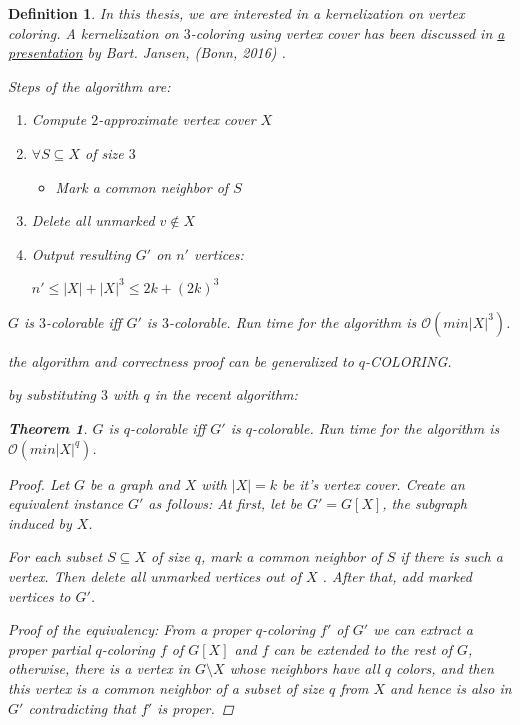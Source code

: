 \documentclass[12pt]{article}
\theoremstyle{slplain}
\newtheorem{theorem}{Theorem}[section]
\newtheorem{defi}{Definition}[section]
\begin{document}
\begin{defi}
In this thesis, we are interested in a kernelization on vertex coloring. 
A kernelization on $3$-coloring using vertex cover has been discussed in \href{https://onedrive.live.com/view.aspx?resid=D39E73028C0B20E6!2586&ithint=file%2cpptx&app=PowerPoint&authkey=!AFs8zyWC8bfQ0PA}{a presentation} by Bart. Jansen, (Bonn, 2016) \cite{bart}.

Steps of the algorithm are:

\begin{enumerate}
\item Compute $2$-approximate vertex cover $X$

\item $\forall S\subseteq X$ of size $3$
\begin{itemize}
\item Mark a common neighbor of $S$
\end{itemize}
\item Delete all unmarked $v \not\in X$

\item Output resulting $G'$ on $n'$ vertices:

\begin{center}
$n' \leq |X| + |X|^3 \leq 2k + (2k)^3$
\end{center}
\end{enumerate}

$G$ is $3$-colorable iff $G'$ is $3$-colorable. Run time for the algorithm is $\mathcal{O}(min|X|^3)$.

the algorithm and correctness proof can be generalized to $q$-COLORING. \cite{kra}


by substituting $3$ with $q$ in the recent algorithm:

\begin{theorem}{\label{main theorem}}
$G$ is $q$-colorable iff $G'$ is $q$-colorable. Run time for the algorithm
is $\mathcal{O}(min|X|^q)$.
\end{theorem}

\begin{proof}
Let $G$ be a graph and $X$ with $|X| = k$ be it's vertex cover. Create an
equivalent instance $G'$ as follows: At first, let be $G' = G[X]$,  the subgraph induced by $X$. 

For each subset
$S \subseteq X$ of size $q$, mark a common neighbor of $S$ if there is such a vertex.
Then delete all unmarked vertices out of $X$ . After that, add marked vertices to $G'$. 

Proof of the equivalency: From a proper $q$-coloring $f'$ of $G'$ we
can extract a proper partial $q$-coloring $f$ of $G[X]$ and $f$ can be extended to the rest of $G$, otherwise, there is a vertex in $G \setminus X$ whose neighbors have all $q$ colors, and then this vertex is a common neighbor of a subset of size $q$ from
$X$ and hence is also in $G'$ contradicting that $f'$ is proper.


\end{proof}
\end{defi}
\end{document}
